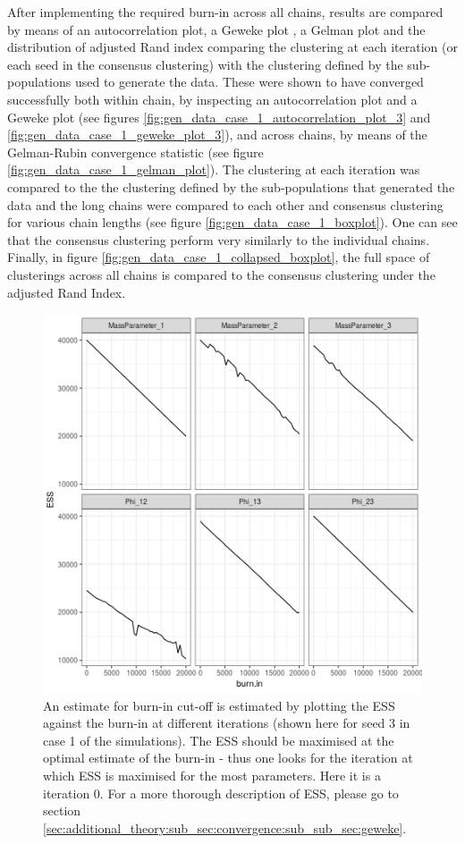 \documentclass[12pt]{article} %
\begin{document}
	After implementing the required burn-in across all chains, results are compared by means of an autocorrelation plot, a Geweke plot \citep{GewekeEvaluatingAccuracySamplingBased}, a Gelman plot \citep{GelmanInferenceIterativeSimulation1992} and the distribution of adjusted Rand index comparing the clustering at each iteration (or each seed in the consensus clustering) with the clustering defined by the sub-populations used to generate the data. These were shown to have converged successfully both within chain, by inspecting an autocorrelation plot and a Geweke plot (see figures \ref{fig:gen_data_case_1_autocorrelation_plot_3} and \ref{fig:gen_data_case_1_geweke_plot_3}), and across chains, by means of the Gelman-Rubin convergence statistic (see figure \ref{fig:gen_data_case_1_gelman_plot}). The clustering at each iteration was compared to the the clustering defined by the sub-populations that generated the data and the long chains were compared to each other and consensus clustering for various chain lengths (see figure \ref{fig:gen_data_case_1_boxplot}). One can see that the consensus clustering perform very similarly to the individual chains. Finally, in figure \ref{fig:gen_data_case_1_collapsed_boxplot}, the full space of clusterings across all chains is compared to the consensus clustering under the adjusted Rand Index.


	\begin{figure}[!htb]
	\centering
	\includegraphics[scale=0.65]{Images/Gen_data/Case_1/Esimated_burn_in_plot_3.png}
	\caption{An estimate for burn-in cut-off is estimated by plotting the ESS against the burn-in at different iterations (shown here for seed 3 in case 1 of the simulations). The ESS should be maximised at the optimal estimate of the burn-in - thus one looks for the iteration at which ESS is maximised for the most parameters. Here it is a iteration 0. For a more thorough description of ESS, please go to section \ref{sec:additional_theory:sub_sec:convergence:sub_sub_sec:geweke}.}
	\label{fig:gen_data_case_1_estimated_burn_in_plot_3}
\end{figure}
\end{document}

